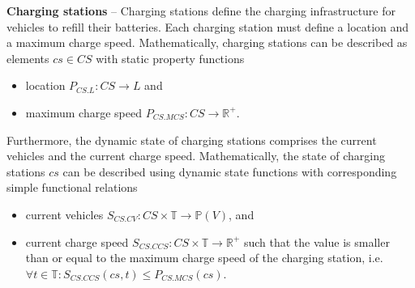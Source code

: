 \documentclass[graybox]{svmult}
\begin{document}
\noindent
\textbf{Charging stations}
--
Charging stations define the charging infrastructure for vehicles to refill their batteries.
Each charging station must define a location and a maximum charge speed.
Mathematically, charging stations can be described as elements $cs \in CS$ with static property functions
\begin{itemize}
	\item location $P_{CS.L}: CS \rightarrow L$ and
	\item maximum charge speed $P_{CS.MCS}: CS \rightarrow \mathbb{R}^+$.
\end{itemize}
Furthermore, the dynamic state of charging stations comprises the current vehicles and the current charge speed.
Mathematically, the state of charging stations $cs$ can be described using dynamic state functions with corresponding simple functional relations
\begin{itemize}
	\item current vehicles $S_{CS.CV}: CS \times \mathbb{T} \rightarrow \mathbb{P}(V)$, and
	\item current charge speed $S_{CS.CCS}: CS \times \mathbb{T} \rightarrow \mathbb{R}^+$ such that the value is smaller than or equal to the maximum charge speed of the charging station, i.e.\ $\forall t \in \mathbb{T}: S_{CS.CCS}(cs,t) \leq P_{CS.MCS}(cs)$.
\end{itemize}
\vspace{2mm}
\end{document}
